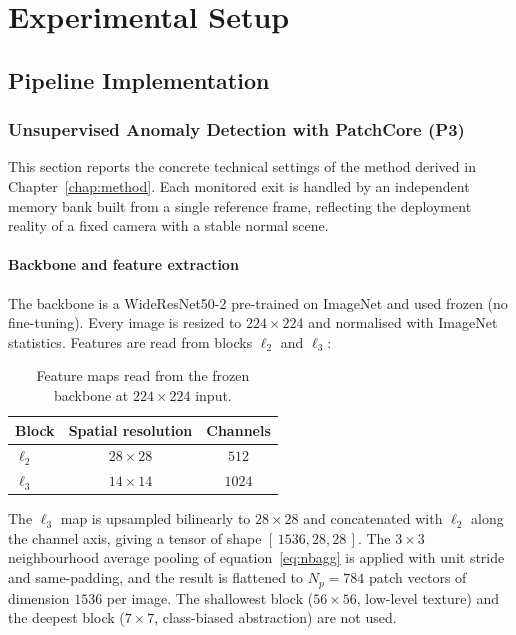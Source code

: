 \chapter{Experimental Setup}
\label{chap:setup}

\section{Pipeline Implementation}

\subsection{Unsupervised Anomaly Detection with PatchCore (P3)}

This section reports the concrete technical settings of the method derived in
Chapter~\ref{chap:method}. Each monitored exit is handled by an independent
memory bank built from a single reference frame, reflecting the deployment
reality of a fixed camera with a stable normal scene.

\subsubsection{Backbone and feature extraction}

The backbone is a WideResNet50-2 \cite{Zagoruyko2016} pre-trained on ImageNet and
used frozen (no fine-tuning). Every image is resized to $224 \times 224$ and
normalised with ImageNet statistics. Features are read from blocks $\ell_2$ and
$\ell_3$:

\begin{table}[h]
  \centering
  \begin{tabular}{lcc}
    \hline
    Block & Spatial resolution & Channels \\
    \hline
    $\ell_2$ & $28 \times 28$ & $512$ \\
    $\ell_3$ & $14 \times 14$ & $1024$ \\
    \hline
  \end{tabular}
  \caption{Feature maps read from the frozen backbone at $224\times224$ input.}
  \label{tab:p3-layers}
\end{table}

The $\ell_3$ map is upsampled bilinearly to $28 \times 28$ and concatenated with
$\ell_2$ along the channel axis, giving a tensor of shape
$[\,1536, 28, 28\,]$. The $3 \times 3$ neighbourhood average pooling of
equation~\eqref{eq:nbagg} is applied with unit stride and same-padding, and the
result is flattened to $N_p = 784$ patch vectors of dimension $1536$ per image.
The shallowest block ($56\times56$, low-level texture) and the deepest block
($7\times7$, class-biased abstraction) are not used.

